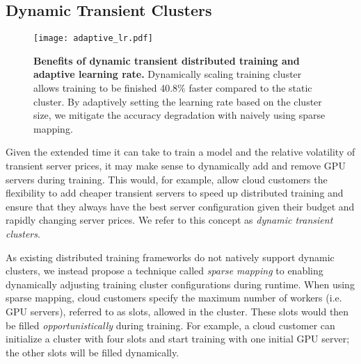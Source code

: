 

\subsection{Dynamic Transient Clusters}


\begin{figure}[t]
\centering
    \texttt{[image: adaptive\_lr.pdf]}
    \caption{\textbf{Benefits of dynamic transient distributed training and adaptive learning rate.}
    Dynamically scaling training cluster allows training to be finished 40.8\% faster compared to the static cluster. 
    By adaptively setting the learning rate based on the cluster size, we mitigate the accuracy degradation with naively using sparse mapping.}
    \label{fig:adaptive_lr}
\end{figure}

Given the extended time it can take to train a model and the relative
volatility of transient server prices, it may make sense to dynamically add and
remove GPU servers during training. This would, for example, allow cloud
customers the flexibility to add cheaper transient servers to speed up
distributed training and ensure that they always have the best server
configuration given their budget and rapidly changing server prices. We refer
to this concept as \emph{dynamic transient clusters}.  

As existing distributed training frameworks do not natively support dynamic
clusters, we instead propose a technique called  \emph{sparse mapping} to
enabling dynamically adjusting training cluster configurations during runtime.
When using sparse mapping, cloud customers specify the maximum number of
workers (i.e. GPU servers), referred to as slots, allowed in the cluster. These
slots would then be filled \emph{opportunistically} during training.  For example, a
cloud customer can initialize a cluster with four slots and start training with one
initial GPU server; the other slots will be filled dynamically.  


